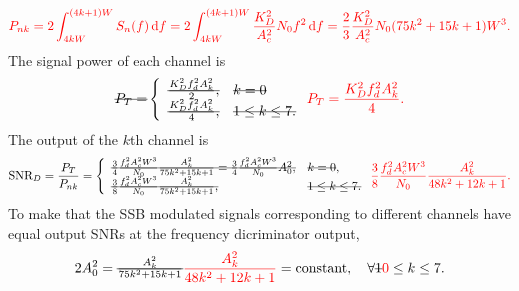 \documentclass{assignment}
\begin{document}
\begin{sol}
\begin{itemize}
\begin{align}
        \end{align}
        \begin{align}
            \color{red}P_{nk}=2\int_{4kW}^{(4k+1)W}S_n(f)\,\mathrm{d}f=2\int_{4kW}^{(4k+1)W}\frac{K_D^2}{A_c^2}N_0f^2\,\mathrm{d}f=\frac{2}{3}\frac{K_D^2}{A_c^2}N_0(75k^2+15k+1)W^3.
        \end{align}
        The signal power of each channel is
        \begin{align}
            \text{\sout{$P_T=$}}\left\{\begin{array}{ll}
                \text{\sout{$\frac{K_D^2f_d^2A_k^2}{2},$}}&\text{\sout{$k=0$}}\\
                \text{\sout{$\frac{K_D^2f_d^2A_k^2}{4},$}}&\text{\sout{$1\leq k\leq 7.$}}
            \end{array}\right.{\color{red}P_T=\frac{K_D^2f_d^2A_k^2}{4}.}
        \end{align}
        The output of the $k$th channel is
        \begin{align}
            \text{SNR}_D=\frac{P_T}{P_{nk}}=\left\{\begin{array}{ll}
                \text{\sout{$\frac{3}{4}\frac{f_d^2A_c^2W^3}{N_0}\frac{A_k^2}{75k^2+15k+1}=\frac{3}{4}\frac{f_d^2A_c^2W^3}{N_0}A_0^2,$}}&\text{\sout{$k=0$}},\\
                \text{\sout{$\frac{3}{8}\frac{f_d^2A_c^2W^3}{N_0}\frac{A_k^2}{75k^2+15k+1},$}}&\text{\sout{$1\leq k\leq 7.$}}
            \end{array}\right.{\color{red}\frac{3}{8}\frac{f_d^2A_c^2W^3}{N_0}\frac{A_k^2}{48k^2+12k+1}.}
        \end{align}
        To make that the SSB modulated signals corresponding to different channels have equal output SNRs at the frequency dicriminator output,
        \begin{align}
            2A_0^2=\text{\sout{$\frac{A_k^2}{75k^2+15k+1}$}}{\color{red}\frac{A_k^2}{48k^2+12k+1}}=\text{constant},\quad\forall\text{\sout{$1$}}{\color{red}0}\leq k\leq 7.
        \end{align}
    \end{itemize}
\end{sol}
\end{document}
